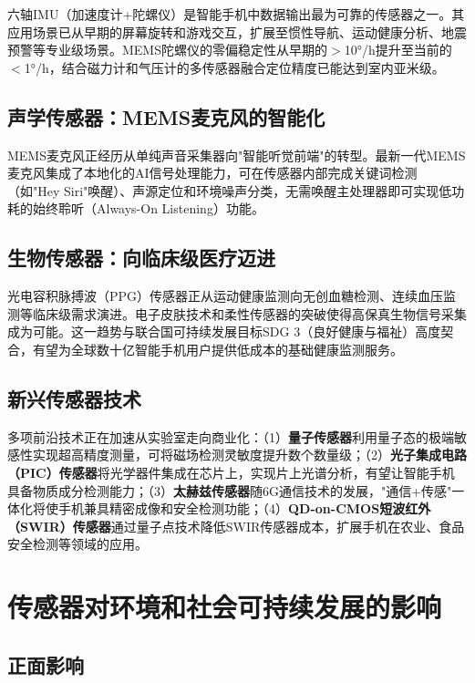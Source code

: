 \documentclass[12pt, a4paper]{ctexart}
\begin{document}
六轴IMU（加速度计+陀螺仪）是智能手机中数据输出最为可靠的传感器之一\cite{alibaba2026}。其应用场景已从早期的屏幕旋转和游戏交互，扩展至惯性导航、运动健康分析、地震预警等专业级场景。MEMS陀螺仪的零偏稳定性从早期的$>$10$°$/h提升至当前的$<$1$°$/h，结合磁力计和气压计的多传感器融合定位精度已能达到室内亚米级。

\subsection{声学传感器：MEMS麦克风的智能化}

MEMS麦克风正经历从单纯声音采集器向"智能听觉前端"的转型。最新一代MEMS麦克风集成了本地化的AI信号处理能力，可在传感器内部完成关键词检测（如"Hey Siri"唤醒）、声源定位和环境噪声分类，无需唤醒主处理器即可实现低功耗的始终聆听（Always-On Listening）功能。

\subsection{生物传感器：向临床级医疗迈进}

光电容积脉搏波（PPG）传感器正从运动健康监测向无创血糖检测、连续血压监测等临床级需求演进。电子皮肤技术和柔性传感器的突破使得高保真生物信号采集成为可能\cite{innosensor2025}。这一趋势与联合国可持续发展目标SDG 3（良好健康与福祉）高度契合，有望为全球数十亿智能手机用户提供低成本的基础健康监测服务。

\subsection{新兴传感器技术}

多项前沿技术正在加速从实验室走向商业化\cite{innosensor2025}：（1）\textbf{量子传感器}利用量子态的极端敏感性实现超高精度测量，可将磁场检测灵敏度提升数个数量级；（2）\textbf{光子集成电路（PIC）传感器}将光学器件集成在芯片上，实现片上光谱分析，有望让智能手机具备物质成分检测能力；（3）\textbf{太赫兹传感器}随6G通信技术的发展，"通信+传感"一体化将使手机兼具精密成像和安全检测功能；（4）\textbf{QD-on-CMOS短波红外（SWIR）传感器}通过量子点技术降低SWIR传感器成本，扩展手机在农业、食品安全检测等领域的应用。


\section{传感器对环境和社会可持续发展的影响}

\subsection{正面影响}
\end{document}
